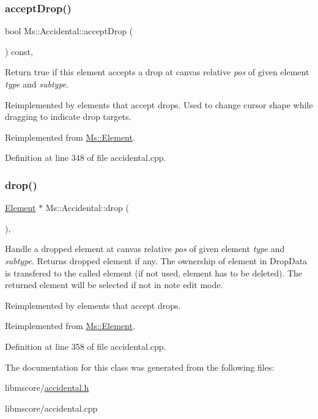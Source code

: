 \subsubsection{\texorpdfstring{accept\+Drop()}{acceptDrop()}}
{\footnotesize\ttfamily bool Ms\+::\+Accidental\+::accept\+Drop (\begin{DoxyParamCaption}\item[{\hyperlink{class_ms_1_1_edit_data}{Edit\+Data} \&}]{ }\end{DoxyParamCaption}) const\hspace{0.3cm}{\ttfamily [override]}, {\ttfamily [virtual]}}

Return true if this element accepts a drop at canvas relative {\itshape pos} of given element {\itshape type} and {\itshape subtype}.

Reimplemented by elements that accept drops. Used to change cursor shape while dragging to indicate drop targets. 

Reimplemented from \hyperlink{class_ms_1_1_element_a35614445f0bc2212cbcc75c3f5810543}{Ms\+::\+Element}.



Definition at line 348 of file accidental.\+cpp.

\mbox{\label{class_ms_1_1_accidental_acdbf43ac373defb983202d4f7c8e3555}} 
\subsubsection{\texorpdfstring{drop()}{drop()}}
{\footnotesize\ttfamily \hyperlink{class_ms_1_1_element}{Element} $\ast$ Ms\+::\+Accidental\+::drop (\begin{DoxyParamCaption}\item[{\hyperlink{class_ms_1_1_edit_data}{Edit\+Data} \&}]{ }\end{DoxyParamCaption})\hspace{0.3cm}{\ttfamily [override]}, {\ttfamily [virtual]}}

Handle a dropped element at canvas relative {\itshape pos} of given element {\itshape type} and {\itshape subtype}. Returns dropped element if any. The ownership of element in Drop\+Data is transfered to the called element (if not used, element has to be deleted). The returned element will be selected if not in note edit mode.

Reimplemented by elements that accept drops. 

Reimplemented from \hyperlink{class_ms_1_1_element_a0ca69a9fb48e7b9fb481aacaf3860032}{Ms\+::\+Element}.



Definition at line 358 of file accidental.\+cpp.



The documentation for this class was generated from the following files\+:\begin{DoxyCompactItemize}
\item 
libmscore/\hyperlink{accidental_8h}{accidental.\+h}\item 
libmscore/accidental.\+cpp\end{DoxyCompactItemize}
